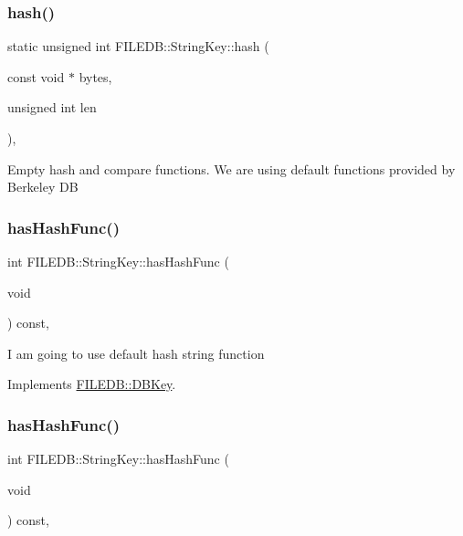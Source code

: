 \subsubsection{\texorpdfstring{hash()}{hash()}\hspace{0.1cm}{\footnotesize\ttfamily [3/3]}}
{\footnotesize\ttfamily static unsigned int F\+I\+L\+E\+D\+B\+::\+String\+Key\+::hash (\begin{DoxyParamCaption}\item[{const void $\ast$}]{bytes,  }\item[{unsigned int}]{len }\end{DoxyParamCaption})\hspace{0.3cm}{\ttfamily [inline]}, {\ttfamily [static]}}

Empty hash and compare functions. We are using default functions provided by Berkeley DB \mbox{\label{classFILEDB_1_1StringKey_afb2fa99d53c0f4b5aeca0377228ea722}} 
\subsubsection{\texorpdfstring{hasHashFunc()}{hasHashFunc()}\hspace{0.1cm}{\footnotesize\ttfamily [1/3]}}
{\footnotesize\ttfamily int F\+I\+L\+E\+D\+B\+::\+String\+Key\+::has\+Hash\+Func (\begin{DoxyParamCaption}\item[{void}]{ }\end{DoxyParamCaption}) const\hspace{0.3cm}{\ttfamily [inline]}, {\ttfamily [virtual]}}

I am going to use default hash string function 

Implements \mbox{\hyperlink{classFILEDB_1_1DBKey_a541dab4f4083ae951dee2f30483eb18e}{F\+I\+L\+E\+D\+B\+::\+D\+B\+Key}}.

\mbox{\label{classFILEDB_1_1StringKey_afb2fa99d53c0f4b5aeca0377228ea722}} 
\subsubsection{\texorpdfstring{hasHashFunc()}{hasHashFunc()}\hspace{0.1cm}{\footnotesize\ttfamily [2/3]}}
{\footnotesize\ttfamily int F\+I\+L\+E\+D\+B\+::\+String\+Key\+::has\+Hash\+Func (\begin{DoxyParamCaption}\item[{void}]{ }\end{DoxyParamCaption}) const\hspace{0.3cm}{\ttfamily [inline]}, {\ttfamily [virtual]}}

